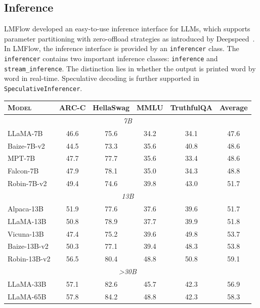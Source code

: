 \documentclass[11pt]{article}
\begin{document}
\subsection{Inference}
LMFlow developed an easy-to-use inference interface for LLMs, which
supports parameter partitioning with zero-offload strategies as introduced by Deepspeed~\citep{ren2021zero}.
In LMFlow, the inference interface is provided by an \texttt{inferencer} class.
The \texttt{inferencer} contains two important inference classes: \texttt{inference} and \texttt{stream\_inference}.
The distinction lies in whether the output is printed word by word in real-time. Speculative decoding is further supported in \texttt{SpeculativeInferencer}.



\begin{table}[t]
\centering
\footnotesize
\begin{tabular}{l|c|c|c|c|c}
\toprule
\textsc{Model}  & ARC-C  & HellaSwag & MMLU & TruthfulQA  & Average   \\
 \midrule
 \multicolumn{6}{c}{\textit{7B}}
  \\ \midrule
LLaMA-7B~\citep{touvron2023llama} & 46.6 & 75.6 & 34.2 & 34.1 & 47.6 \\
Baize-7B-v2~\citep{xu2023baize}  & 44.5 & 73.3 & 35.6 & 40.8 & 48.6 \\
MPT-7B~\citep{MosaicML2023Introducing}  & 47.7 & 77.7 & 35.6 & 33.4 & 48.6 \\
Falcon-7B~\citep{refinedweb}  & 47.9 & 78.1 & 35.0 & 34.3 & 48.8 \\
Robin-7B-v2 & 49.4 & 74.6 & 39.8 & 43.0 & 51.7 \\
 \midrule
 \multicolumn{6}{c}{\textit{13B}}
  \\ \midrule
Alpaca-13B~\citep{alpaca}  & 51.9 & 77.6 & 37.6 & 39.6 & 51.7 \\
LLaMA-13B~\citep{touvron2023llama}  & 50.8 & 78.9 & 37.7 & 39.9 & 51.8 \\
Vicuna-13B~\citep{zheng2023judging}  & 47.4 & 75.2 & 39.6 & 49.8 & 53.7 \\
Baize-13B-v2~\citep{xu2023baize}  & 50.3 & 77.1 & 39.4 & 48.3 & 53.8 \\
Robin-13B-v2 & 56.5 & 80.4 & 48.8 & 50.8 & 59.1  \\
 \midrule
 \multicolumn{6}{c}{\textit{>30B}}
  \\ \midrule
LLaMA-33B~\citep{touvron2023llama}  & 57.1 & 82.6 & 45.7 & 42.3 & 56.9 \\
LLaMA-65B~\citep{touvron2023llama}  & 57.8 & 84.2 & 48.8 & 42.3 & 58.3 \\

\end{tabular}
\end{table}
\end{document}
